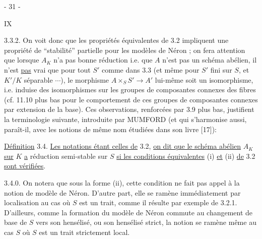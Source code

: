 \begin{center}- 31 -\end{center}\hfill IX

3.3.2. On voit donc que les propriétés équivalentes de 3.2 impliquent
une propriété de ``stabilité'' partielle pour les modèles de Néron ; on
fera attention que lorsque $A_K$ n'a pas bonne réduction i.e. que $A$ n'est
pas un schéma abélien, il n'est \uline{pas} vrai que pour tout $S'$ comme dans
3.3 (et même pour $S'$ fini sur $S$, et $K'/K$ séparable $\cdots$), le morphisme
$A\times_S S'\longrightarrow A'$ lui-même soit un isomorphisme, i.e. induise des isomorphismes
sur les groupes de composantes connexes des fibres (cf. 11.10 plus bas
pour le comportement de ces groupes de composantes connexes par extension
de la base). Ces observations, renforcées par 3.9 plus bas, justifient
la terminologie suivante, introduite par MUMFORD (et qui s'harmonise
aussi, paraît-il, avec les notions de même nom étudiées dans son livre [17]):

\uline{Définition} 3.4. \uline{Les notations étant celles de} 3.2, \uline{on dit que le schéma
abélien} $A_K$ \uline{sur} $K$ \uline{a} réduction semi-stable sur $S$ \uline{si les conditions équivalentes} (i) \uline{et} (ii) \uline{de} 3.2 \uline{sont vérifiées}.

3.4.0. On notera que sous la forme (ii), cette condition ne fait pas
appel à la notion de modèle de Néron. D'autre part, elle se ramène
immédiatement par localisation au cas où $S$ est un trait, comme il
résulte par exemple de 3.2.1. D'ailleurs, comme la formation du modèle
de Néron commute au changement de base de $S$ vers son hensélisé, ou
son hensélisé strict, la notion se ramène même au cas $S$ où $S$ est
un trait strictement local.
